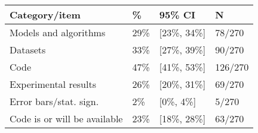 \begin{tabular}{llll}
\hline
Category/item & \% & 95\% CI  & N \\
\hline
Models and algorithms & 29\% & [23\%, 34\%] & 78/270\\
Datasets & 33\% & [27\%, 39\%] & 90/270\\
Code & 47\% & [41\%, 53\%] & 126/270\\
Experimental results & 26\% & [20\%, 31\%] & 69/270\\
Error bars/stat. sign.& 2\% & [0\%, 4\%] & 5/270\\
Code is or will be available & 23\% & [18\%, 28\%] & 63/270\\
\hline
\end{tabular}

